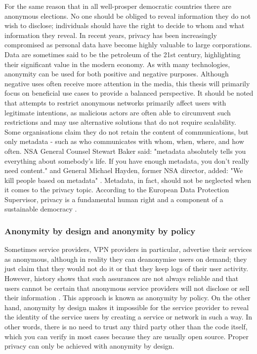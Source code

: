 For the same reason that in all well-prosper democratic countries there are anonymous elections. No one should be obliged to reveal information they do not wish to disclose; individuals should have the right to decide to whom and what information they reveal. In recent years, privacy has been increasingly compromised as personal data have become highly valuable to large corporations. Data are sometimes said to be the petroleum of the 21st century, highlighting their significant value in the modern economy.
As with many technologies, anonymity can be used for both positive and negative purposes. Although negative uses often receive more attention in the media, this thesis will primarily focus on beneficial use cases to provide a balanced perspective.
It should be noted that attempts to restrict anonymous networks primarily affect users with legitimate intentions, as malicious actors are often able to circumvent such restrictions and may use alternative solutions that do not require scalability.
Some organisations claim they do not retain the content of communications, but only metadata - such as who communicates with whom, when, where, and how often. NSA General Counsel Stewart Baker said: "metadata absolutely tells you everything about somebody’s life. If you have enough metadata, you don’t really need content." and General Michael Hayden, former NSA director, added: "We kill people based on metadata" \cite{metadata-kill}. Metadata, in fact, should not be neglected when it comes to the privacy topic.
According to the European Data Protection Supervisor, privacy is a fundamental human right and a component of a sustainable democracy \cite{privacy-eu}.

\subsubsection{Anonymity by design and anonymity by policy}
Sometimes service providers, VPN providers in particular, advertise their services as anonymous, although in reality they can deanonymise users on demand; they just claim that they would not do it or that they keep logs of their user activity. However, history shows that such assurances are not always reliable and that users cannot be certain that anonymous service providers will not disclose or sell their information \cite{vpns}. This approach is known as anonymity by policy.
On the other hand, anonymity by design makes it impossible for the service provider to reveal the identity of the service users by creating a service or network in such a way. In other words, there is no need to trust any third party other than the code itself, which you can verify in most cases because they are usually open source. Proper privacy can only be achieved with anonymity by design.

